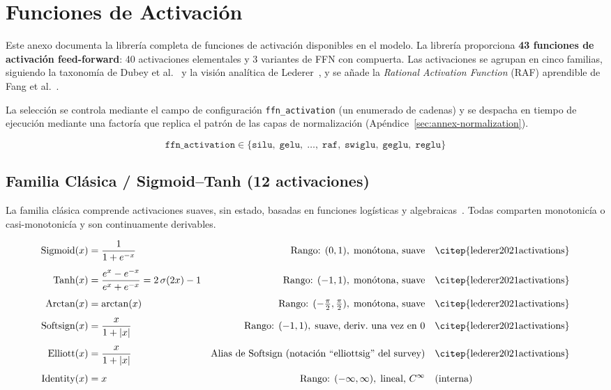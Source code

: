 \section{Funciones de Activación}
\label{sec:annex-funciones-activacion}

Este anexo documenta la librería completa de funciones de activación
disponibles en el modelo. La librería proporciona \textbf{43 funciones de
activación feed-forward}: 40 activaciones elementales y 3 variantes de FFN con
compuerta. Las activaciones se agrupan en cinco familias, siguiendo la
taxonomía de Dubey et al.~\citep{dubey2021activations} y la visión analítica de
Lederer~\citep{lederer2021activations}, y se añade la \emph{Rational Activation
Function} (RAF) aprendible de Fang et al.~\citep{fang2023raft}.

La selección se controla mediante el campo de configuración
\texttt{ffn\_activation} (un enumerado de cadenas) y se despacha en tiempo de
ejecución mediante una factoría que replica el patrón de las capas de
normalización (Apéndice~\ref{sec:annex-normalization}).

\[
\texttt{ffn\_activation} \in \{\texttt{silu},\;\texttt{gelu},\;\dots,\;
\texttt{raf},\;\texttt{swiglu},\;\texttt{geglu},\;\texttt{reglu}\}
\]

\subsection{Familia Clásica / Sigmoid--Tanh (12 activaciones)}

La familia clásica comprende activaciones suaves, sin estado, basadas en
funciones logísticas y algebraicas~\citep{lederer2021activations,dubey2021activations}.
Todas comparten monotonicía o casi-monotonicía y son continuamente derivables.

{\footnotesize
\begin{align}
  \text{Sigmoid}(x) &= \frac{1}{1+e^{-x}}
    & \text{Rango: } (0,1),\;\text{monótona, suave}
    & \quad \text{\citep{lederer2021activations}} \\[4pt]
  \text{Tanh}(x) &= \frac{e^{x}-e^{-x}}{e^{x}+e^{-x}} = 2\,\sigma(2x)-1
    & \text{Rango: } (-1,1),\;\text{monótona, suave}
    & \quad \text{\citep{lederer2021activations}} \\[4pt]
  \text{Arctan}(x) &= \arctan(x)
    & \text{Rango: } (-\tfrac{\pi}{2},\tfrac{\pi}{2}),\;\text{monótona, suave}
    & \quad \text{\citep{lederer2021activations}} \\[4pt]
  \text{Softsign}(x) &= \frac{x}{1+|x|}
    & \text{Rango: } (-1,1),\;\text{suave, deriv.\ una vez en 0}
    & \quad \text{\citep{lederer2021activations}} \\[4pt]
  \text{Elliott}(x) &= \frac{x}{1+|x|}
    & \text{Alias de Softsign (notación ``elliottsig'' del survey)}
    & \quad \text{\citep{lederer2021activations}} \\[4pt]
  \text{Identity}(x) &= x
    & \text{Rango: } (-\infty,\infty),\;\text{lineal, }C^\infty
    & \quad \text{(interna)}
\end{align}
}  %


